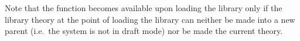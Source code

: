Note that the function  becomes available upon loading the
 library only if the library theory  at the point
of loading the library can neither be made into a new parent (i.e.\ the system
is not in draft mode) nor be made the current
theory.
